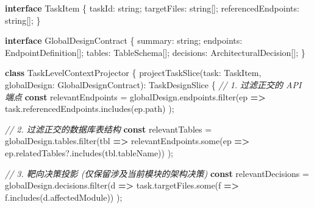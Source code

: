 \documentclass[
]{ctexart}
\newenvironment{Shaded}{}{}
\newcommand{\AttributeTok}[1]{\textcolor[rgb]{0.49,0.56,0.16}{#1}}
\newcommand{\CommentTok}[1]{\textcolor[rgb]{0.38,0.63,0.69}{\textit{#1}}}
\newcommand{\DataTypeTok}[1]{\textcolor[rgb]{0.56,0.13,0.00}{#1}}
\newcommand{\FunctionTok}[1]{\textcolor[rgb]{0.02,0.16,0.49}{#1}}
\newcommand{\KeywordTok}[1]{\textcolor[rgb]{0.00,0.44,0.13}{\textbf{#1}}}
\newcommand{\NormalTok}[1]{#1}
\newcommand{\OperatorTok}[1]{\textcolor[rgb]{0.40,0.40,0.40}{#1}}
\renewcommand{\_}{\discretionary{}{}{\textunderscore}}
\begin{document}
\begin{Shaded}
\begin{Highlighting}[]
\KeywordTok{interface}\NormalTok{ TaskItem \{}
\NormalTok{  taskId}\OperatorTok{:} \DataTypeTok{string}\OperatorTok{;}
\NormalTok{  targetFiles}\OperatorTok{:} \DataTypeTok{string}\NormalTok{[]}\OperatorTok{;}
\NormalTok{  referencedEndpoints}\OperatorTok{:} \DataTypeTok{string}\NormalTok{[]}\OperatorTok{;}
\NormalTok{\}}

\KeywordTok{interface}\NormalTok{ GlobalDesignContract \{}
\NormalTok{  summary}\OperatorTok{:} \DataTypeTok{string}\OperatorTok{;}
\NormalTok{  endpoints}\OperatorTok{:}\NormalTok{ EndpointDefinition[]}\OperatorTok{;}
\NormalTok{  tables}\OperatorTok{:}\NormalTok{ TableSchema[]}\OperatorTok{;}
\NormalTok{  decisions}\OperatorTok{:}\NormalTok{ ArchitecturalDecision[]}\OperatorTok{;}
\NormalTok{\}}

\KeywordTok{class}\NormalTok{ TaskLevelContextProjector \{}
  \FunctionTok{projectTaskSlice}\NormalTok{(task}\OperatorTok{:}\NormalTok{ TaskItem}\OperatorTok{,}\NormalTok{ globalDesign}\OperatorTok{:}\NormalTok{ GlobalDesignContract)}\OperatorTok{:}\NormalTok{ TaskDesignSlice \{}
    \CommentTok{// 1. 过滤正交的 API 端点}
    \KeywordTok{const}\NormalTok{ relevantEndpoints }\OperatorTok{=}\NormalTok{ globalDesign}\OperatorTok{.}\AttributeTok{endpoints}\OperatorTok{.}\FunctionTok{filter}\NormalTok{(ep }\KeywordTok{=\textgreater{}} 
\NormalTok{      task}\OperatorTok{.}\AttributeTok{referencedEndpoints}\OperatorTok{.}\FunctionTok{includes}\NormalTok{(ep}\OperatorTok{.}\AttributeTok{path}\NormalTok{)}
\NormalTok{    )}\OperatorTok{;}

    \CommentTok{// 2. 过滤正交的数据库表结构}
    \KeywordTok{const}\NormalTok{ relevantTables }\OperatorTok{=}\NormalTok{ globalDesign}\OperatorTok{.}\AttributeTok{tables}\OperatorTok{.}\FunctionTok{filter}\NormalTok{(tbl }\KeywordTok{=\textgreater{}}
\NormalTok{      relevantEndpoints}\OperatorTok{.}\FunctionTok{some}\NormalTok{(ep }\KeywordTok{=\textgreater{}}\NormalTok{ ep}\OperatorTok{.}\AttributeTok{relatedTables}\OperatorTok{?.}\FunctionTok{includes}\NormalTok{(tbl}\OperatorTok{.}\AttributeTok{tableName}\NormalTok{))}
\NormalTok{    )}\OperatorTok{;}

    \CommentTok{// 3. 靶向决策投影 (仅保留涉及当前模块的架构决策)}
    \KeywordTok{const}\NormalTok{ relevantDecisions }\OperatorTok{=}\NormalTok{ globalDesign}\OperatorTok{.}\AttributeTok{decisions}\OperatorTok{.}\FunctionTok{filter}\NormalTok{(d }\KeywordTok{=\textgreater{}}
\NormalTok{      task}\OperatorTok{.}\AttributeTok{targetFiles}\OperatorTok{.}\FunctionTok{some}\NormalTok{(f }\KeywordTok{=\textgreater{}}\NormalTok{ f}\OperatorTok{.}\FunctionTok{includes}\NormalTok{(d}\OperatorTok{.}\AttributeTok{affectedModule}\NormalTok{))}
\NormalTok{    )}\OperatorTok{;}


\end{Highlighting}
\end{Shaded}
\end{document}
